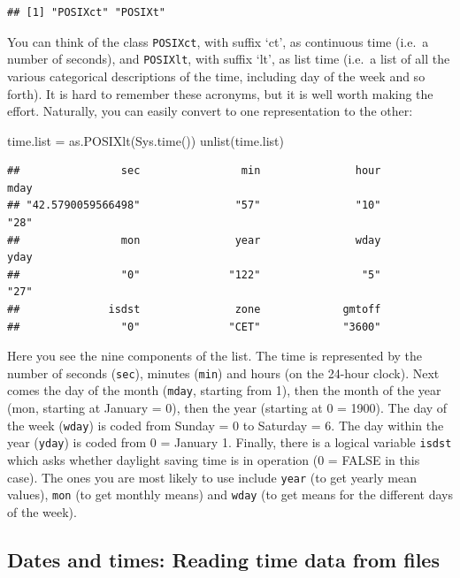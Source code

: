 \documentclass[
]{book}
\newenvironment{Shaded}{\begin{snugshade}}{\end{snugshade}}
\newcommand{\FunctionTok}[1]{\textcolor[rgb]{0.00,0.00,0.00}{#1}}
\newcommand{\NormalTok}[1]{#1}
\newcommand{\OtherTok}[1]{\textcolor[rgb]{0.56,0.35,0.01}{#1}}
\theoremstyle{definition}
\theoremstyle{definition}
\theoremstyle{definition}
\theoremstyle{definition}
\theoremstyle{remark}
\begin{document}
\begin{verbatim}
## [1] "POSIXct" "POSIXt"
\end{verbatim}

You can think of the class \texttt{POSIXct}, with suffix `ct', as continuous time (i.e.~a number of seconds), and
\texttt{POSIXlt}, with suffix `lt', as list time (i.e.~a list of all the various categorical descriptions of the time,
including day of the week and so forth). It is hard to remember these acronyms, but it is well worth making
the effort. Naturally, you can easily convert to one representation to the other:

\begin{Shaded}
\begin{Highlighting}[]
\NormalTok{time.list }\OtherTok{=} \FunctionTok{as.POSIXlt}\NormalTok{(}\FunctionTok{Sys.time}\NormalTok{())}
\FunctionTok{unlist}\NormalTok{(time.list)}
\end{Highlighting}
\end{Shaded}

\begin{verbatim}
##                sec                min               hour               mday 
## "42.5790059566498"               "57"               "10"               "28" 
##                mon               year               wday               yday 
##                "0"              "122"                "5"               "27" 
##              isdst               zone             gmtoff 
##                "0"              "CET"             "3600"
\end{verbatim}

Here you see the nine components of the list. The time is represented by the number of seconds (\texttt{sec}), minutes (\texttt{min}) and hours (on the 24-hour clock). Next comes the day of the month (\texttt{mday}, starting from 1), then the month of the year (mon, starting at January = 0), then the year (starting at 0 = 1900). The day of the week (\texttt{wday}) is coded from Sunday = 0 to Saturday = 6. The day within the year (\texttt{yday}) is coded from 0 = January 1. Finally, there is a logical variable \texttt{isdst} which asks whether daylight saving time is in operation (0 = FALSE in this case). The ones you are most likely to use include \texttt{year} (to get yearly mean values), \texttt{mon} (to get monthly means) and \texttt{wday} (to get means for the different days of the week).

\hypertarget{dates-and-times-reading-time-data-from-files}{%
\subsection{Dates and times: Reading time data from files}\label{dates-and-times-reading-time-data-from-files}}
\end{document}
